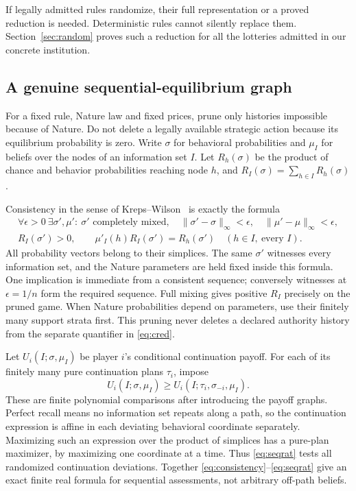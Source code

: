 \documentclass[11pt,a4paper]{article}
\numberwithin{equation}{section}
\theoremstyle{definition}
\begin{document}
If legally admitted rules randomize, their full representation or a proved
reduction is needed. Deterministic rules cannot silently replace them.
Section~\ref{sec:random} proves such a reduction for all the lotteries
admitted in our concrete institution.

\subsection{A genuine sequential-equilibrium graph}
For a fixed rule, Nature law and fixed prices, prune only histories
impossible because of Nature. Do not delete a legally available strategic
action because its equilibrium probability is zero. Write \(\sigma\) for
behavioral probabilities and \(\mu_I\) for beliefs over the nodes of an
information set \(I\). Let \(R_h(\sigma)\) be the product of chance and
behavior probabilities reaching node \(h\), and
\(R_I(\sigma)=\sum_{h\in I}R_h(\sigma)\).

Consistency in the sense of Kreps--Wilson~\cite{kw} is exactly the formula
\begin{equation}\label{eq:consistency}
\begin{gathered}
\forall \epsilon>0\ \exists \sigma',\mu':\
\sigma'\text{ completely mixed},\quad
\|\sigma'-\sigma\|_\infty<\epsilon,\quad
\|\mu'-\mu\|_\infty<\epsilon,\\
R_I(\sigma')>0,\qquad
\mu'_I(h)R_I(\sigma')=R_h(\sigma')
               \quad(h\in I,\ \text{every }I).
\end{gathered}
\end{equation}
All probability vectors belong to their simplices. The same \(\sigma'\)
witnesses every information set, and the Nature parameters are held fixed
inside this formula. One implication is immediate from a consistent
sequence; conversely witnesses at \(\epsilon=1/n\) form the required
sequence. Full mixing gives positive \(R_I\) precisely on the pruned game.
When Nature probabilities depend on parameters, use their finitely many
support strata first. This pruning never deletes a declared authority
history from the separate quantifier in \eqref{eq:cred}.

Let \(U_i(I;\sigma,\mu_I)\) be player \(i\)'s conditional continuation
payoff. For each of its finitely many pure continuation plans \(\tau_i\),
impose
\begin{equation}\label{eq:seqrat}
U_i(I;\sigma,\mu_I)\ge
                 U_i(I;\tau_i,\sigma_{-i},\mu_I).
\end{equation}
These are finite polynomial comparisons after introducing the payoff
graphs. Perfect recall means no information set repeats along a path, so
the continuation expression is affine in each deviating behavioral
coordinate separately. Maximizing such an expression over the product
of simplices has a pure-plan maximizer, by maximizing one coordinate at
a time. Thus \eqref{eq:seqrat} tests all randomized continuation deviations.
Together \eqref{eq:consistency}--\eqref{eq:seqrat} give an exact finite real
formula for sequential assessments, not arbitrary off-path beliefs.
\end{document}
